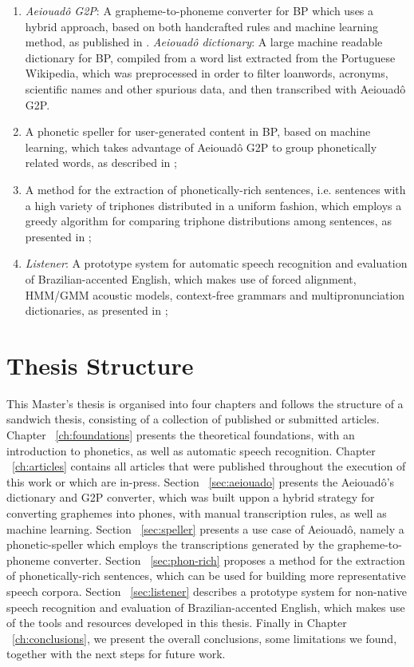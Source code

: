 \begin{enumerate}
 \item \emph{Aeiouad\^o G2P}: A grapheme-to-phoneme converter for \ac{BP} which uses a hybrid approach, based on both handcrafted rules and machine learning method, as published in \citeauthor{Mendonca2014} \cite{Mendonca2014}. \emph{Aeiouad\^o dictionary}: A large machine readable dictionary for \ac{BP}, compiled from a word list extracted from the Portuguese Wikipedia, which was preprocessed in order to filter loanwords, acronyms, scientific names and other spurious data, and then transcribed with Aeiouad\^o G2P.
 \item A phonetic speller for user-generated content in \ac{BP}, based on machine learning, which takes advantage of Aeiouad\^o G2P to group phonetically related words, as described in \citeauthor{Mendonca2015} \cite{Mendonca2015}; 
 \item A method for the extraction of phonetically-rich sentences, i.e. sentences with a high variety of triphones distributed in a uniform fashion, which employs a greedy algorithm for comparing triphone distributions among sentences, as presented in \citeauthor{Mendonca2014b} \cite{Mendonca2014b};
 \item \emph{Listener}: A prototype system for automatic speech recognition and evaluation of Brazilian-accented English, which makes use of forced alignment, \ac{HMM}/\ac{GMM} acoustic models, context-free grammars and multipronunciation dictionaries, as presented in \citeauthor{Mendonca2016} \cite{Mendonca2016};
\end{enumerate}

\section*{Thesis Structure}

This Master's thesis is organised into four chapters and follows the structure of a sandwich thesis, consisting of a collection of published or submitted articles. Chapter ~\ref{ch:foundations} presents the theoretical foundations, with an introduction to phonetics, as well as automatic speech recognition. Chapter ~\ref{ch:articles} contains all articles that were published throughout the execution of this work or which are in-press. Section ~\ref{sec:aeiouado} presents the Aeiouad\^o's dictionary and \ac{G2P} converter, which was built uppon a hybrid strategy for converting graphemes into phones, with manual transcription rules, as well as machine learning. Section ~\ref{sec:speller} presents a use case of Aeiouad\^o, namely a phonetic-speller which employs the transcriptions generated by the grapheme-to-phoneme converter. Section ~\ref{sec:phon-rich} proposes a method for the extraction of phonetically-rich sentences, which can be used for building more representative speech corpora. Section ~\ref{sec:listener} describes a prototype system for non-native speech recognition and evaluation of Brazilian-accented English, which makes use of the tools and resources developed in this thesis. Finally in Chapter ~\ref{ch:conclusions}, we present the overall conclusions, some limitations we found, together with the next steps for future work.
